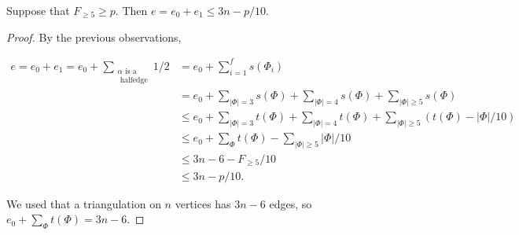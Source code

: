 \documentclass[10pt,a4paper]{amsart}
\begin{document}
\begin{claim} \label{claim:f>=5}
Suppose that $F_{\ge 5}\ge p $. Then 
$e=e_0+e_1\le 3n-p/10$.
\end{claim}

\begin{proof}
By the previous observations,

\begin{align*}
e =e_0+e_1=e_0+\sum_{\substack{ \alpha \text{ is a} \\ \text{ halfedge} }} 1/2 &= e_0+\sum_{i=1}^f  s(\Phi_i)\\
&= e_0 + \sum_{|\Phi|=3}s(\Phi) + \sum_{|\Phi|=4}s(\Phi)+ \sum_{|\Phi|\ge 5}s(\Phi)\\
&\le
e_0 + \sum_{|\Phi|=3}t(\Phi) + \sum_{|\Phi|=4}t(\Phi) + \sum_{|\Phi|\ge 5}(t(\Phi)-|\Phi|/10)\\
&\le
e_0 + \sum_{\Phi}t(\Phi) - \sum_{|\Phi|\ge 5}|\Phi|/10\\
&\le 3n-6-F_{\ge 5}/10\\
&\leq  3n-p/10.
\end{align*}

We used that a triangulation on $n$ vertices has $3n-6$ edges, so 
$e_0 + \sum_{\Phi}t(\Phi)=3n-6$.

\end{proof}
\end{document}
